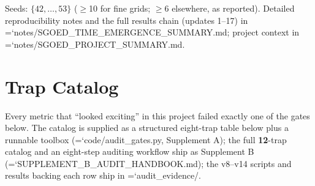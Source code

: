 \documentclass[12pt,a4paper]{article}
\renewcommand{\texttt}[1]{{\ttfamily\hyphenchar\font=`\-\relax #1}}
\begin{document}
Seeds: \(\{42,\dots,53\}\) ($\geq$10 for fine grids; $\geq$6 elsewhere, as
reported). Detailed reproducibility notes and the full results chain
(updates 1--17) in \texttt{notes/SGOED\_TIME\_EMERGENCE\_SUMMARY.md};
project context in \texttt{notes/SGOED\_PROJECT\_SUMMARY.md}.

\endgroup\section{Trap Catalog}\label{appendix-b-trap-catalog}

Every metric that ``looked exciting'' in this project failed exactly one
of the gates below. The catalog is supplied as a structured eight-trap
table below plus a runnable toolbox (\texttt{code/audit\_gates.py},
Supplement A); the full \textbf{12}-trap catalog and an eight-step
auditing workflow ship as Supplement B
(\texttt{SUPPLEMENT\_B\_AUDIT\_HANDBOOK.md}); the v8--v14 scripts and
results backing each row ship in \texttt{audit\_evidence/}.
\end{document}
